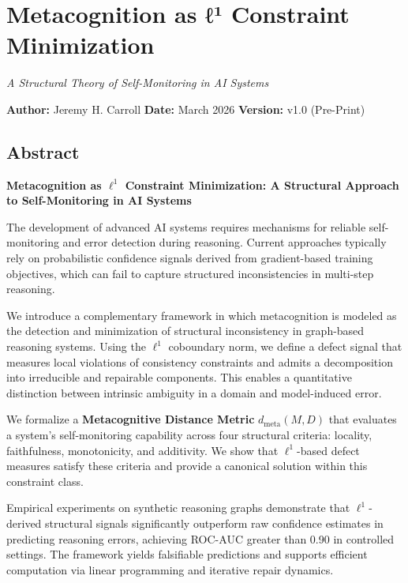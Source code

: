 \documentclass[
]{article}
\author{}
\date{}
\begin{document}
\section{Metacognition as ℓ¹ Constraint
Minimization}\label{metacognition-as-ux2113uxb9-constraint-minimization}

\emph{A Structural Theory of Self-Monitoring in AI Systems}

\textbf{Author:} Jeremy H. Carroll \textbf{Date:} March 2026
\textbf{Version:} v1.0 (Pre-Print)

\subsection{Abstract}\label{abstract}

\textbf{Metacognition as \(\ell^1\) Constraint Minimization: A
Structural Approach to Self-Monitoring in AI Systems}

The development of advanced AI systems requires mechanisms for reliable
self-monitoring and error detection during reasoning. Current approaches
typically rely on probabilistic confidence signals derived from
gradient-based training objectives, which can fail to capture structured
inconsistencies in multi-step reasoning.

We introduce a complementary framework in which metacognition is modeled
as the detection and minimization of structural inconsistency in
graph-based reasoning systems. Using the \(\ell^1\) coboundary norm, we
define a defect signal that measures local violations of consistency
constraints and admits a decomposition into irreducible and repairable
components. This enables a quantitative distinction between intrinsic
ambiguity in a domain and model-induced error.

We formalize a \textbf{Metacognitive Distance Metric}
\(d_{\mathrm{meta}}(M, D)\) that evaluates a system's self-monitoring
capability across four structural criteria: locality, faithfulness,
monotonicity, and additivity. We show that \(\ell^1\)-based defect
measures satisfy these criteria and provide a canonical solution within
this constraint class.

Empirical experiments on synthetic reasoning graphs demonstrate that
\(\ell^1\)-derived structural signals significantly outperform raw
confidence estimates in predicting reasoning errors, achieving ROC-AUC
greater than 0.90 in controlled settings. The framework yields
falsifiable predictions and supports efficient computation via linear
programming and iterative repair dynamics.
\end{document}
